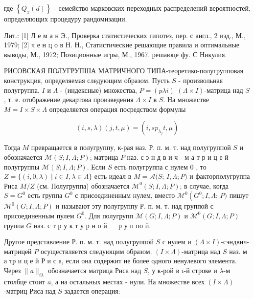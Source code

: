 \documentclass[10pt]{article}
\begin{document}
где $\left\{Q_{x}(d)\right\}$ - семейство марковских переходных распределений вероятностей, определяющих процедуру рандомизации.



Лит.: [1] Л е м а н Э., Проверка статистических гипотез, пер. с англ., 2 изд., М., 1979; [2] ч е н ц о в Н. Н., Статистические решающие правила и оптимальные выводы, М., 1972; Позиционные игры, М., 1967. решаюце фу. С Никулия.



РИСОВСКАЯ ПОЛУГРУПША МАТРИЧНОГО ТИПА-теоретико-полугрупповая конструкция, определяемая следующим образом. Пусть $S$ - произвольная полугруппа, $I$ и $\Lambda$ - (индексные) множества, $P=(p \lambda i)$ $(\Lambda \times I)$-матрица над $S$, т. е. отображение декартова произведения $\Lambda \times I$ в $S$. На множестве $M=I \times S \times \Lambda$ определяется операция посредством формулы



\[

(i, s, \lambda)(j, t, \mu)=\left(i, s p_{\lambda_{j}} t, \mu\right)

\]



Тогда $M$ превращается в полугруппу, к-рая наз. Р. п. м. т. над полугруппой $S$ и обозначается $\mathscr{M}(S ; I, \Lambda ; P)$; матрица $P$ наз. с э н д в и ч - м а т р и ц е й полугруппы $\mathscr{M}(S ; I, \Lambda ; P)$. Если $S$ есть полугруппа с нулем 0 , то $Z=\{(i, 0, \lambda) \mid i \in I, \lambda \in \Lambda\}$ есть идеал в $M=\mathscr{A}(S$; $I, \Lambda ; P)$ и факторполугруппа Риса $M / Z$ (см. Полугруппа) обозначается $\mathscr{M}^{0}(S ; I, \Lambda ; P)$; в случае, когда $S=G^{0}$ есть группа $G^{0}$ с присоединенным нулем, вместо $\mathscr{M}^{0}\left(G^{0} ; I, \Lambda\right.$; $P)$ пишут $\mathscr{M}^{0}(G ; I, \Lambda ; P)$ и называют эту полугруппу Р. п. м. т. над группой с присоединенным пулем $G^{0}$. Для полугрупп $\mathscr{M}(G ; I, \Lambda ; P)$ и $\mathscr{M}^{0}(G ; I, \Lambda ; P)$ группа $G$ наз. с т р у к т у р н о й $\quad$ р у п по й.



Другое представление Р. п. м. т. над полугруппой $S$ с нулем и $(\Lambda \times I)$-сэндвич-матрицей $P$ осуществляется следующим образом. $(I \times \Lambda)$-матрица над $S$ наз. м а тр и ц е й Р и с а, если она содержит не более одного ненулевого элемента. Через $\|a\|_{i \lambda}$ обозначается матрица Риса над $S$, у к-рой в $i$-й строке и $\lambda$-м столбце стоит $a$, а на остальных местах - нули. На множестве всех $(I \times \Lambda)$-матриц Риса над $S$ задается операция:
\end{document}
